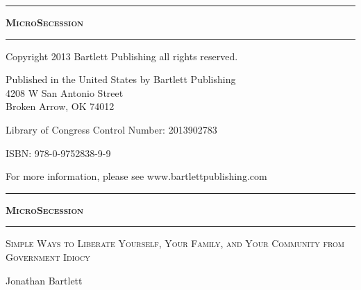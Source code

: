 \begin{titlepage}
\begin{center}

\thispagestyle{empty}
\vspace*{\fill}
\hrule
{\LARGE \textsc{\textbf{MicroSecession}}}
\baselineskip
\hrule
\vspace*{\fill}

\clearpage

\thispagestyle{empty}
\vspace*{\fill}

{\small
Copyright 2013 Bartlett Publishing all rights reserved.

Published in the United States by Bartlett Publishing\\
4208 W San Antonio Street\\
Broken Arrow, OK 74012

Library of Congress Control Number: 2013902783

ISBN: 978-0-9752838-9-9

For more information, please see www.bartlettpublishing.com
}
\vspace*{\fill}

\clearpage

\thispagestyle{empty}
\vspace*{\fill}
\hrule
{\LARGE \textsc{\textbf{MicroSecession}}}
\baselineskip
\hrule
{}\baselineskip
{\Large \textsc{Simple Ways to Liberate Yourself, Your Family, and Your Community from Government Idiocy}}

\baselineskip

{\Large Jonathan Bartlett}

\baselineskip


\vspace*{\fill}

\end{center}
\end{titlepage}
